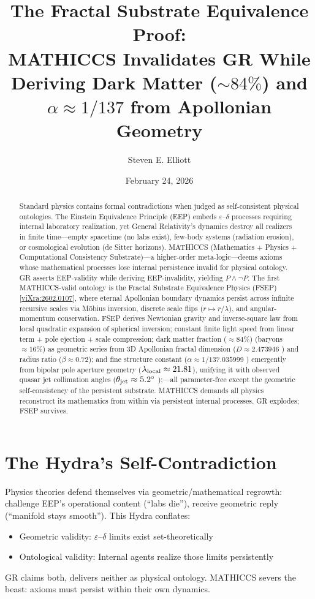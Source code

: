 \documentclass[11pt,a4paper]{article}
\title{\textbf{The Fractal Substrate Equivalence Proof:}\\
\vspace{0.5em}
\large MATHICCS Invalidates GR While Deriving Dark Matter ($\sim 84\%$) and $\alpha \approx 1/137$ from Apollonian Geometry}
\author{Steven E. Elliott}
\date{February 24, 2026}
\begin{document}
\maketitle

\begin{abstract}
Standard physics contains formal contradictions when judged as self-consistent physical ontologies. The Einstein Equivalence Principle (EEP) embeds $\varepsilon$--$\delta$ processes requiring internal laboratory realization, yet General Relativity's dynamics destroy all realizers in finite time---empty spacetime (no labs exist), few-body systems (radiation erosion), or cosmological evolution (de Sitter horizons). MATHICCS (Mathematics + Physics + Computational Consistency Substrate)---a higher-order meta-logic---deems axioms whose mathematical processes lose internal persistence invalid for physical ontology. GR asserts EEP-validity while deriving EEP-invalidity, yielding $P \land \neg P$. The first MATHICCS-valid ontology is the Fractal Substrate Equivalence Physics (FSEP) [\href{https://vixra.org/abs/2602.0107}{viXra:2602.0107}], where eternal Apollonian boundary dynamics persist across infinite recursive scales via M\"obius inversion, discrete scale flips ($r\mapsto r/\lambda$), and angular-momentum conservation. FSEP derives Newtonian gravity and inverse-square law from local quadratic expansion of spherical inversion; constant finite light speed from linear term + pole ejection + scale compression; dark matter fraction ($\approx 84\%$) (baryons $\approx 16\%$) as geometric series from 3D Apollonian fractal dimension ($D\approx 2.473946$ \cite{borkovec1994}) and radius ratio ($\beta\approx 0.72$); and fine structure constant ($\alpha\approx 1/137.035999$ \cite{codata2022}) emergently from bipolar pole aperture geometry ($\lambda_{\rm local}\approx 21.81$), unifying it with observed quasar jet collimation angles ($\theta_{\rm jet}\approx 5.2^\circ$ \cite{hada2018});---all parameter-free except the geometric self-consistency of the persistent substrate. MATHICCS demands all physics reconstruct its mathematics from within via persistent internal processes. GR explodes; FSEP survives.
\end{abstract}

\section{The Hydra's Self-Contradiction}
Physics theories defend themselves via geometric/mathematical regrowth: challenge EEP's operational content (``labs die''), receive geometric reply (``manifold stays smooth''). This Hydra conflates:
\begin{itemize}
\item Geometric validity: $\varepsilon$--$\delta$ limits exist set-theoretically
\item Ontological validity: Internal agents realize those limits persistently
\end{itemize}
GR claims both, delivers neither as physical ontology. MATHICCS severs the beast: axioms must persist within their own dynamics.
\end{document}
